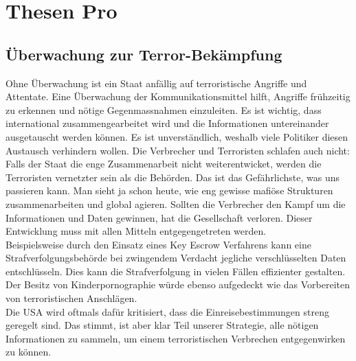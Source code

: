 \section{Thesen Pro}
\subsection{Überwachung zur Terror-Bekämpfung}
Ohne Überwachung ist ein Staat anfällig auf terroristische Angriffe und 
Attentate. Eine Überwachung der Kommunikationsmittel hilft, Angriffe 
frühzeitig zu erkennen und nötige Gegenmassnahmen einzuleiten. Es ist 
wichtig, dass international zusammengearbeitet wird und die 
Informationen untereinander ausgetauscht werden können. Es ist 
unverst\"andlich, weshalb viele Politiker diesen Austausch verhindern wollen. Die 
Verbrecher und Terroristen schlafen auch nicht: Falls der Staat die enge 
Zusammenarbeit nicht weiterentwicket, werden die Terroristen vernetzter sein als 
die Beh\"orden. Das ist das Gefährlichste, was uns passieren kann. Man sieht ja 
schon heute, wie eng gewisse mafiöse Strukturen zusammenarbeiten und 
global agieren. Sollten die Verbrecher den Kampf um die Informationen 
und Daten gewinnen, hat die Gesellschaft verloren. Dieser Entwicklung
muss mit allen Mitteln entgegengetreten werden.\\
Beispielsweise durch den Einsatz eines Key Escrow Verfahrens kann eine 
Strafverfolgungsbehörde bei zwingendem Verdacht jegliche 
verschlüsselten Daten entschlüsseln. Dies kann die Strafverfolgung in 
vielen Fällen effizienter gestalten. Der Besitz von Kinderpornographie 
würde ebenso aufgedeckt wie das Vorbereiten von terroristischen 
Anschlägen.\\
Die USA wird oftmals dafür kritisiert, dass die 
Einreisebestimmungen streng geregelt sind. Das stimmt, ist aber klar 
Teil unserer Strategie, alle nötigen Informationen zu sammeln, um einem 
terroristischen Verbrechen entgegenwirken zu können.


